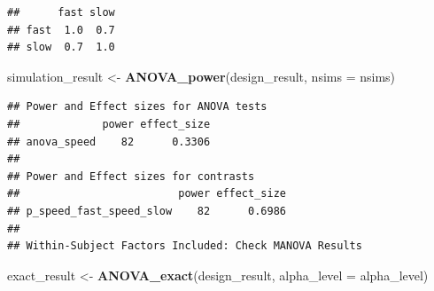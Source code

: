 \documentclass[]{book}
\newenvironment{Shaded}{\begin{snugshade}}{\end{snugshade}}
\newcommand{\DataTypeTok}[1]{\textcolor[rgb]{0.13,0.29,0.53}{#1}}
\newcommand{\FloatTok}[1]{\textcolor[rgb]{0.00,0.00,0.81}{#1}}
\newcommand{\KeywordTok}[1]{\textcolor[rgb]{0.13,0.29,0.53}{\textbf{#1}}}
\newcommand{\NormalTok}[1]{#1}
\newcommand{\OperatorTok}[1]{\textcolor[rgb]{0.81,0.36,0.00}{\textbf{#1}}}
\newcommand{\StringTok}[1]{\textcolor[rgb]{0.31,0.60,0.02}{#1}}
\begin{document}
\begin{Shaded}
\end{Shaded}

\begin{verbatim}
##      fast slow
## fast  1.0  0.7
## slow  0.7  1.0
\end{verbatim}

\begin{Shaded}
\begin{Highlighting}[]
\NormalTok{simulation_result <-}\StringTok{ }\KeywordTok{ANOVA_power}\NormalTok{(design_result, }\DataTypeTok{nsims =}\NormalTok{ nsims)}
\end{Highlighting}
\end{Shaded}

\begin{verbatim}
## Power and Effect sizes for ANOVA tests
##             power effect_size
## anova_speed    82      0.3306
## 
## Power and Effect sizes for contrasts
##                         power effect_size
## p_speed_fast_speed_slow    82      0.6986
## 
## Within-Subject Factors Included: Check MANOVA Results
\end{verbatim}

\begin{Shaded}
\begin{Highlighting}[]
\NormalTok{exact_result <-}\StringTok{ }\KeywordTok{ANOVA_exact}\NormalTok{(design_result, }\DataTypeTok{alpha_level =}\NormalTok{ alpha_level)}
\end{Highlighting}
\end{Shaded}
\end{document}
